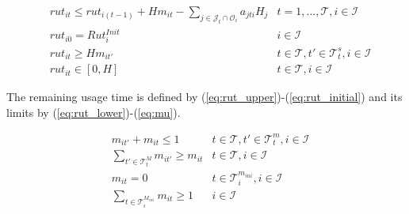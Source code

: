 \documentclass[a4paper,onecolumn,fleqn]{article}
\begin{document}
    \begin{align}
         & rut_{it} \leq rut_{i(t-1)} + H m_{it} - \sum_{j \in \mathcal{J}_t \cap \mathcal{O}_i} a_{jti} H_j 
            & t =1, ..., \mathcal{T}, i \in \mathcal{I} \label{eq:rut_upper}\\
        & rut_{i0} = Rut^{Init}_i
               & i \in \mathcal{I} \label{eq:rut_initial}\\
        & rut_{it} \geq H m_{it'}
                & t \in \mathcal{T}, t' \in \mathcal{T}^{s}_t, i \in \mathcal{I}\label{eq:rut_lower}\\ 
        & rut_{it} \in [0,H]
                & t \in \mathcal{T}, i \in \mathcal{I} \label{eq:mu}              
    \end{align}

    The remaining usage time is defined by (\ref{eq:rut_upper})-(\ref{eq:rut_initial}) and its limits by (\ref{eq:rut_lower})-(\ref{eq:mu}). 

    \begin{align}
        & m_{it'} + m_{it} \leq 1
          & t \in \mathcal{T}, t' \in \mathcal{T}^{m}_t, i \in \mathcal{I}\label{eq:ret_min}\\ 
        & \sum_{t' \in \mathcal{T}^{M}_t} m_{it'} \geq  m_{it}
          & t \in \mathcal{T}, i \in \mathcal{I}\label{eq:ret_max}\\
        & m_{it} = 0
          & t \in \mathcal{T}^{m_{ini}}_i, i \in \mathcal{I}\label{eq:ret_min_init} \\
        & \sum_{t \in \mathcal{T}^{M_{ini}}_i} m_{it} \geq  1 
          & i \in \mathcal{I}\label{eq:ret_max_init}
    \end{align}
\end{document}
